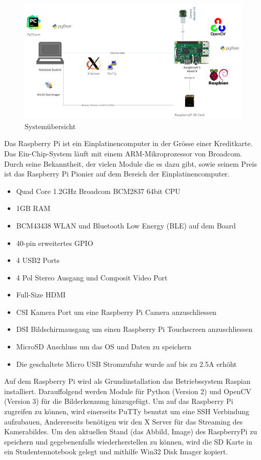 \documentclass[a4paper]{report}
\begin{document}
\begin{figure}[h!]
	\includegraphics[keepaspectratio,width=\textwidth]{TargetRecOS}
	\caption{Systemübersicht}
	\label{fig:Systemuebersicht}
\end{figure}

Das Raspberry Pi ist ein Einplatinencomputer in der Grösse einer Kreditkarte. Das Ein-Chip-System läuft mit einem ARM-Mikroprozessor von Broadcom. Durch seine Bekanntheit, der vielen Module die es dazu gibt, sowie seinem Preis ist das Raspberry Pi Pionier auf dem Bereich der Einplatinencomputer.

\begin{itemize}[noitemsep]
	\item Quad Core 1.2GHz Broadcom BCM2837 64bit CPU
	\item 1GB RAM
	\item BCM43438 WLAN und Bluetooth Low Energy (BLE) auf dem Board
	\item 40-pin erweitertes GPIO
	\item 4 USB2 Ports
	\item 4 Pol Stereo Ausgang und Composit Video Port
	\item Full-Size HDMI
	\item CSI Kamera Port um eine Raspberry Pi Camera anzuschliessen
	\item DSI Bildschirmausgang um einen Raspberry Pi Touchscreen anzuschliessen
	\item MicroSD Anschluss um das OS und Daten zu speichern
	\item Die geschaltete Micro USB Stromzufuhr wurde auf bis zu 2.5A erhöht
\end{itemize}\parencite{RaspberryPiFoundation2017}

\vspace{1em}
Auf dem Raspberry Pi wird als Grundinstallation das Betriebssystem Raspian installiert. Darauffolgend werden Module für Python (Version 2) und OpenCV (Version 3) für die Bilderkennung hinzugefügt.
Um auf das Raspberry Pi zugreifen zu können, wird einerseits PuTTy benutzt um eine SSH Verbindung aufzubauen, Andererseits benötigen wir den X Server für das Streaming des Kamerabildes.
Um den aktuellen Stand (das Abbild, Image) des RaspberryPi zu speichern und gegebenenfalls wiederherstellen zu können, wird die SD Karte in ein Studentennotebook gelegt und mithilfe Win32 Disk Imager kopiert.
\end{document}
